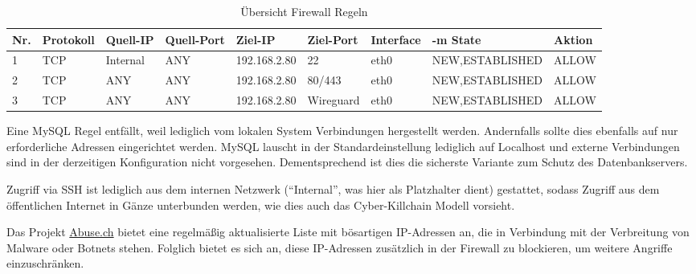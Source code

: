 \begin{table}[!ht]
    \centering
    \begin{adjustbox}{width=\textwidth}

    \begin{tabular}{|l|l|l|l|l|l|l|l|l|}
        \hline
            Nr. & Protokoll & Quell-IP & Quell-Port & Ziel-IP & Ziel-Port & Interface & -m State & Aktion \\ \hline
            1 & TCP & Internal & ANY & 192.168.2.80 & 22 & eth0 & NEW,ESTABLISHED & ALLOW \\ \hline
            2 & TCP & ANY & ANY & 192.168.2.80 & 80/443 & eth0 & NEW,ESTABLISHED & ALLOW \\ \hline
            3 & TCP & ANY & ANY & 192.168.2.80 & Wireguard & eth0 & NEW,ESTABLISHED & ALLOW \\ \hline
        \end{tabular}
    \end{adjustbox}
    \caption{Übersicht Firewall Regeln}
    \label{regeln_fw_incoming}
\end{table}

Eine MySQL Regel entfällt, weil lediglich vom lokalen System Verbindungen hergestellt werden. Andernfalls sollte dies ebenfalls auf nur erforderliche Adressen eingerichtet werden. MySQL lauscht in der Standardeinstellung lediglich auf Localhost und externe Verbindungen sind in der derzeitigen Konfiguration nicht vorgesehen. Dementsprechend ist dies die sicherste Variante zum Schutz des Datenbankservers.

Zugriff via \ac{SSH} ist lediglich aus dem internen Netzwerk (\enquote{Internal}, was hier als Platzhalter dient) gestattet, sodass Zugriff aus dem öffentlichen Internet in Gänze unterbunden werden, wie dies auch das Cyber-Killchain Modell vorsieht.

Das Projekt \href{https://abuse.ch}{Abuse.ch} bietet eine regelmäßig aktualisierte Liste mit bösartigen IP-Adressen an, die in Verbindung mit der Verbreitung von Malware oder Botnets stehen. Folglich bietet es sich an, diese IP-Adressen zusätzlich in der Firewall zu blockieren, um weitere Angriffe einzuschränken.